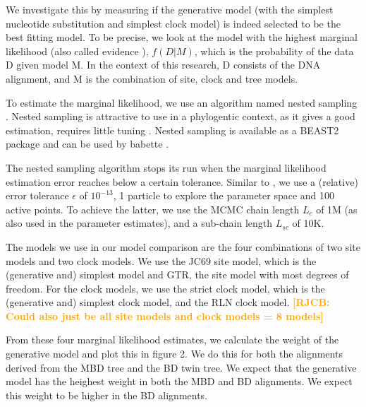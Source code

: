 \documentclass{article}
\newcommand*\richel[1]{\textcolor{orange}{\textbf{[RJCB: #1]}}}
\begin{document}
\begin{itemize}
We investigate this by measuring if the generative model (with the simplest
nucleotide substitution and simplest clock model) is indeed selected 
to be the best fitting model. 
To be precise, we look at the model 
with the highest marginal likelihood 
(also called evidence \cite{mackay2003information}),
$f(D|M)$, which is the probability of the data D given model M.
In the context of this research, D consists of the DNA alignment,
and M is the combination of site, clock and tree models.

To estimate the marginal likelihood, 
we use an algorithm named nested sampling \cite{skilling2006nested}.
Nested sampling is attractive to use
in a phylogentic context, as it gives a good estimation,
requires little tuning \cite{maturana2018}.
Nested sampling is available as a BEAST2 package
and can be used by babette \cite{babette}.

The nested sampling algorithm stops its run 
when the marginal likelihood estimation error 
reaches below a certain tolerance.  
Similar to \cite{maturana2018},
we use a (relative) error tolerance $\epsilon$ of $10^{-13}$,
1 particle to explore the parameter space
and 100 active points. 
To achieve the latter, we use the MCMC chain length $L_c$ of 1M 
(as also used in the parameter estimates),
and a sub-chain length $L_{sc}$ of 10K.

The models we use in our model comparison are the four combinations
of two site models and two clock models. We use the JC69 site model, which
is the (generative and) simplest model and GTR, the site model with most
degrees of freedom. For the clock models, we use the strict clock model,
which is the (generative and) simplest clock model, and the RLN clock model.
\richel{Could also just be all site models and clock models = 8 models}

From these four marginal likelihood estimates, we calculate the weight of
the generative model and plot this in figure 2. We do this for both the 
alignments derived from the MBD tree and the BD twin tree. We expect that
the generative model has the heighest weight in both the MBD and BD alignments.
We expect this weight to be higher in the BD alignments.

\end{itemize}

\end{document}
